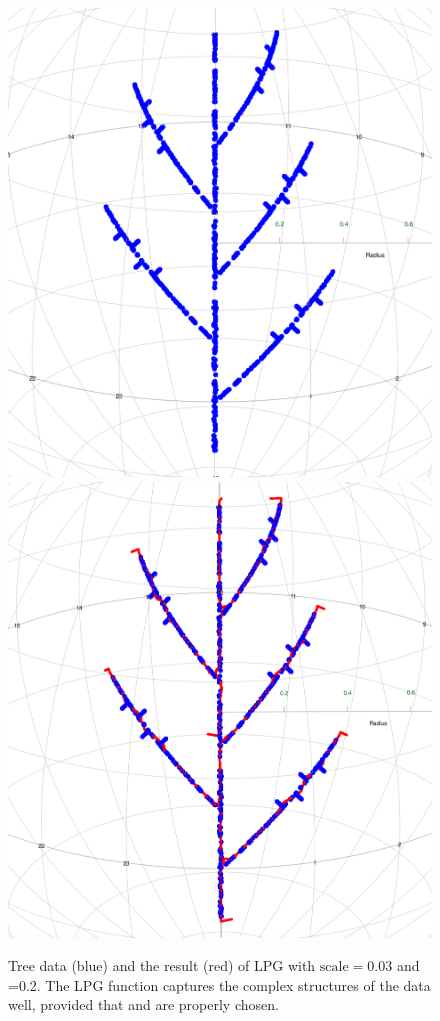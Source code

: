 \begin{figure}[h]
    \centering
    \includegraphics[scale=0.125]{figures/tree.png}
    \hspace{1.5cm}
    \includegraphics[scale=0.12]{figures/LPG(tree).png}
    \caption{Tree data (blue) and the result (red) of LPG with $\mbox{scale}=0.03$ and =0.2. The LPG function captures the complex structures of the data well, provided that  and  are properly chosen.}
    \label{fig:tree}
\end{figure}

